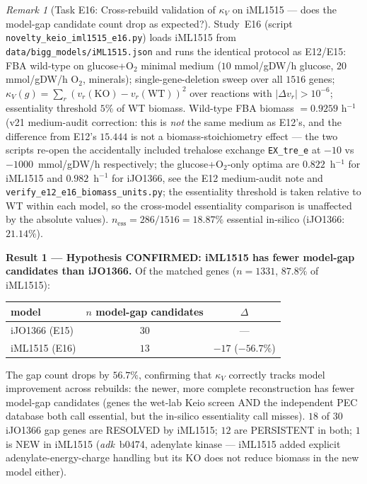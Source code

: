 \documentclass[11pt,a4paper]{article}
\theoremstyle{plain}
\theoremstyle{definition}
\theoremstyle{remark}
\newtheorem{remark}[theorem]{Remark}
\begin{document}
\begin{remark}[Task E16: Cross-rebuild validation of $\kappa_V$ on iML1515
--- does the model-gap candidate count drop as expected?]
\label{rem:e16-iml1515-cross-rebuild}
Study~E16 (script \texttt{novelty\_keio\_iml1515\_e16.py}) loads
iML1515 from \texttt{data/bigg\_models/iML1515.json} and runs the
identical protocol as E12/E15: FBA wild-type on glucose+O$_2$ minimal
medium ($10$ mmol/gDW/h glucose, $20$ mmol/gDW/h O$_2$, minerals);
single-gene-deletion sweep over all $1516$ genes; $\kappa_V(g) =
\sum_r (v_r(\mathrm{KO}) - v_r(\mathrm{WT}))^2$ over reactions with
$|\Delta v_r| > 10^{-6}$; essentiality threshold $5\%$ of WT biomass.
Wild-type FBA biomass $= 0.9259$ h$^{-1}$ (v21 medium-audit
correction: this is \emph{not} the same medium as E12's, and the
difference from E12's $15.444$ is not a biomass-stoichiometry effect
--- the two scripts re-open the accidentally included trehalose
exchange \texttt{EX\_tre\_e} at $-10$ vs $-1000$~mmol/gDW/h
respectively; the glucose+O$_2$-only optima are $0.822$~h$^{-1}$ for
iML1515 and $0.982$~h$^{-1}$ for iJO1366, see the E12 medium-audit
note and \texttt{verify\_e12\_e16\_biomass\_units.py}; the
essentiality threshold is taken relative to WT within each model, so
the cross-model essentiality comparison is unaffected by the absolute
values).
$n_{\mathrm{ess}} = 286/1516 = 18.87\%$ essential in-silico (iJO1366:
$21.14\%$).

\textbf{Result 1 --- Hypothesis CONFIRMED: iML1515 has fewer
model-gap candidates than iJO1366.} Of the matched genes
($n = 1331$, $87.8\%$ of iML1515):
\begin{center}
\begin{tabular}{lcc}
\hline
model & $n$ model-gap candidates & $\Delta$ \\
\hline
iJO1366 (E15) & $30$ & --- \\
iML1515 (E16) & $13$ & $-17$ ($-56.7\%$) \\
\hline
\end{tabular}
\end{center}
The gap count drops by $56.7\%$, confirming that $\kappa_V$ correctly
tracks model improvement across rebuilds: the newer, more complete
reconstruction has fewer model-gap candidates (genes the wet-lab Keio
screen AND the independent PEC database both call essential, but
the in-silico essentiality call misses). $18$ of $30$ iJO1366 gap
genes are RESOLVED by iML1515; $12$ are PERSISTENT in both; $1$ is
NEW in iML1515 (\emph{adk}~b0474, adenylate kinase --- iML1515 added
explicit adenylate-energy-charge handling but its KO does not reduce
biomass in the new model either).


\end{remark}
\end{document}

